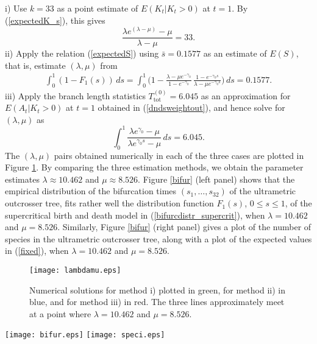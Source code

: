 \documentclass[a4paper,11pt]{article}
\theoremstyle{plain}
\theoremstyle{definition}
\numberwithin{equation}{section}
\begin{document}
\noindent
i) Use $k=33$ as a point estimate of $E(K_t|K_t>0)$ at $t=1$. By (\ref{expectedK_s}), this
gives 
\begin{equation}\label{outnumber}
\frac{\lambda e^{(\lambda-\mu)}-\mu}{\lambda-\mu}=33.
\end{equation}
ii)  Apply the relation (\ref{expectedS}) using $\bar s=0.1577$ as an estimate
of $E(S)$, that is,  estimate $(\lambda,\mu)$ from
\begin{align}
\label{bifurctime}
\int_0^1(1-F_1(s))\,ds =\int_0^1 \big(1-\frac{\lambda-\mu
  e^{-\gamma_0}}{1-e^{-\gamma_0}}\,\frac{1-e^{-\gamma_0
    s}}{\lambda-\mu e^{-\gamma_0 s}}\Big)\,ds = 0.1577. 
\end{align}
iii) Apply the branch length statistics $T^{(0)}_\mathrm{tot}=6.045$ as an
  approximation for $E(A_t|K_t>0)$ at $t=1$ obtained in (\ref{dndsweightout}), 
and hence solve for  $(\lambda,\mu)$ as
\begin{equation}\label{branchestimation}
\int_0^1 \frac{\lambda e^{\gamma_0}-\mu}{\lambda
  e^{\gamma_0s}-\mu}\,ds=6.045. 
\end{equation}
The $(\lambda,\mu)$ pairs obtained numerically in each of
the three cases are plotted in Figure \ref{lambdamu}.
By comparing the three estimation methods, 
we obtain the parameter estimates $\lambda\approx 10.462$ and
$\mu\approx 8.526$. Figure \ref{bifur} (left panel) shows that 
the empirical distribution of the bifurcation times $(s_1,\dots,s_{32})$ of the
ultrametric outcrosser tree, fits rather well the distribution
function $F_1(s)$, $0\le s\le 1$, of the supercritical
birth and death model in (\ref{bifurcdistr_supercrit}), when
$\lambda=10.462$ and $\mu=8.526$. Similarly,  
Figure \ref{bifur} (right panel) gives a plot of the number of species 
in the ultrametric outcrosser tree, along with a plot 
of the expected values in (\ref{fixed}), when $\lambda=10.462$  
and $\mu=8.526$.


\begin{figure}[!t]
\centerline{\texttt{[image: lambdamu.eps]}}
\caption{Numerical solutions for method i) plotted in green, for
  method ii) in blue, and for method iii) in red. The three lines approximately meet at 
  a point where $\lambda=10.462$ and $\mu=8.526$.}
\label{lambdamu}    
\end{figure}



\begin{figure*}[!t]
\centerline{
\texttt{[image: bifur.eps]}
\texttt{[image: speci.eps]}}
\caption{ In the left panel, the red plot gives the empirical distribution of the bifurcation times
  $(s_1,\dots,s_{32})$ of the tree given in Figure \ref{small_rootedultra} and the blue graph is a plot of 
  (\ref{bifurcdistr_supercrit}) with $t=1$, $\lambda=10.462$ and
  $\mu=8.526$. In the right  panel, the red graph is a plot of the number of species versus time for  
the tree given in Figure \ref{small_rootedultra}
and the blue graph is a plot of (\ref{fixed}) with $t=1$, $\lambda=10.462$ and $\mu=8.526$. }
\label{bifur}
\end{figure*}
\end{document}
